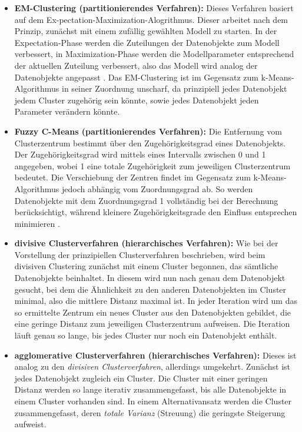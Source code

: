 \begin{itemize}
\newpage		
		
		\item \textbf{EM-Clustering (partitionierendes Verfahren):} Dieses Verfahren basiert auf dem Ex-pectation-Maximization-Alogrithmus. Dieser arbeitet nach dem Prinzip, zunächst mit einem zufällig gewählten Modell zu starten. In der Expectation-Phase werden die Zuteilungen der Datenobjekte zum Modell verbessert, in Maximization-Phase werden die Modellparameter entsprechend der aktuellen Zuteilung verbessert, also das Modell wird analog der Datenobjekte angepasst . Das EM-Clustering ist im Gegensatz zum k-Means-Algorithmus in seiner Zuordnung unscharf, da prinzipiell jedes Datenobjekt jedem Cluster zugehörig sein könnte, sowie jedes Datenobjekt jeden Parameter verändern könnte.  
		\item \textbf{Fuzzy C-Means (partitionierendes Verfahren):} Die Entfernung vom Clusterzentrum bestimmt über den Zugehörigkeitsgrad eines Datenobjekts. Der Zugehörigkeitsgrad wird mittels eines Intervalls zwischen 0 und 1 angegeben, wobei 1 eine totale Zugehörigkeit zum jeweiligen Clusterzentrum bedeutet. Die Verschiebung der Zentren findet im Gegensatz zum k-Means-Algorithmus jedoch abhängig vom Zuordnungsgrad ab. So werden Datenobjekte mit dem Zuordnungsgrad 1 vollständig bei der Berechnung berücksichtigt, während kleinere Zugehörigkeitsgrade den Einfluss entsprechen minimieren .
		\item \textbf{divisive Clusterverfahren (hierarchisches Verfahren):} Wie bei der Vorstellung der prinzipiellen Clusterverfahren beschrieben, wird beim divisiven Clustering zunächst mit einem Cluster begonnen, das sämtliche Datenobjekte beinhaltet. In diesem wird nun nach genau dem Datenobjekt gesucht, bei dem die Ähnlichkeit zu den anderen Datenobjekten im Cluster minimal, also die mittlere Distanz maximal ist. In jeder Iteration wird um das so ermittelte Zentrum ein neues Cluster aus den Datenobjekten gebildet, die eine geringe Distanz zum jeweiligen Clusterzentrum aufweisen. Die Iteration läuft genau so lange, bis jedes Cluster nur noch ein Datenobjekt enthält.      
		\item \textbf{agglomerative Clusterverfahren (hierarchisches Verfahren):} Dieses ist analog zu den \textit{divisiven Clusterverfahren}, allerdings umgekehrt. Zunächst ist jedes Datenobjekt zugleich ein Cluster. Die Cluster mit einer geringen Distanz werden so lange iterativ zusammengefasst, bis alle Datenobjekte in einem Cluster vorhanden sind. In einem Alternativansatz werden die Cluster zusammengefasst, deren \textit{totale Varianz} (Streuung) die geringste Steigerung aufweist. 

\end{itemize}

